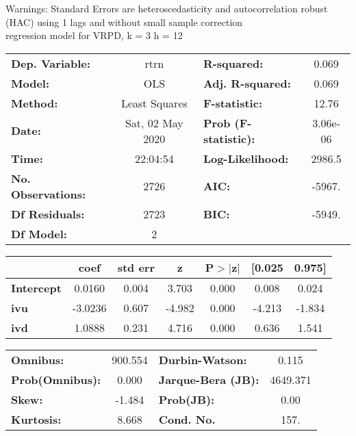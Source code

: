 Warnings: \newline
 [1] Standard Errors are heteroscedasticity and autocorrelation robust (HAC) using 1 lags and without small sample correction\\ 

regression model for VRPD, k = 3 h = 12\begin{center}
\begin{tabular}{lclc}
\toprule
\textbf{Dep. Variable:}    &       rtrn       & \textbf{  R-squared:         } &     0.069   \\
\textbf{Model:}            &       OLS        & \textbf{  Adj. R-squared:    } &     0.069   \\
\textbf{Method:}           &  Least Squares   & \textbf{  F-statistic:       } &     12.76   \\
\textbf{Date:}             & Sat, 02 May 2020 & \textbf{  Prob (F-statistic):} &  3.06e-06   \\
\textbf{Time:}             &     22:04:54     & \textbf{  Log-Likelihood:    } &    2986.5   \\
\textbf{No. Observations:} &        2726      & \textbf{  AIC:               } &    -5967.   \\
\textbf{Df Residuals:}     &        2723      & \textbf{  BIC:               } &    -5949.   \\
\textbf{Df Model:}         &           2      & \textbf{                     } &             \\
\bottomrule
\end{tabular}
\begin{tabular}{lcccccc}
                   & \textbf{coef} & \textbf{std err} & \textbf{z} & \textbf{P$> |$z$|$} & \textbf{[0.025} & \textbf{0.975]}  \\
\midrule
\textbf{Intercept} &       0.0160  &        0.004     &     3.703  &         0.000        &        0.008    &        0.024     \\
\textbf{ivu}       &      -3.0236  &        0.607     &    -4.982  &         0.000        &       -4.213    &       -1.834     \\
\textbf{ivd}       &       1.0888  &        0.231     &     4.716  &         0.000        &        0.636    &        1.541     \\
\bottomrule
\end{tabular}
\begin{tabular}{lclc}
\textbf{Omnibus:}       & 900.554 & \textbf{  Durbin-Watson:     } &    0.115  \\
\textbf{Prob(Omnibus):} &   0.000 & \textbf{  Jarque-Bera (JB):  } & 4649.371  \\
\textbf{Skew:}          &  -1.484 & \textbf{  Prob(JB):          } &     0.00  \\
\textbf{Kurtosis:}      &   8.668 & \textbf{  Cond. No.          } &     157.  \\
\bottomrule
\end{tabular}
\end{center}

